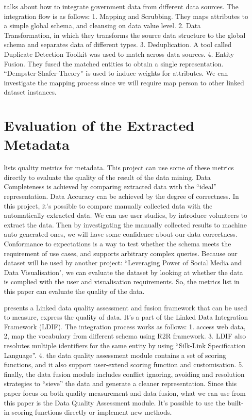 \cite{bohm2010} talks about how to integrate government data from different data sources. The integration flow is as follows: 1. Mapping and Scrubbing. They maps attributes to a simple global schema, and cleansing on data value level. 2. Data Transformation, in which they transforms the source data structure to the global schema and separates data of different types. 3. Deduplication. A tool called Duplicate Detection Toolkit was used to match across data sources. 4. Entity Fusion. They fused the matched entities to obtain a single representation. ``Dempster-Shafer-Theory'' is used to induce weights for attributes. We can investigate the mapping process since we will require map person to other linked dataset instances.

\section{Evaluation of the Extracted Metadata}


\cite{ochoa2006} lists quality metrics for metadata. This project can use some of these metrics directly to evaluate the quality of the result of the data mining. Data Completeness is achieved by comparing extracted data with the ``ideal'' representation. Data Accuracy can be achieved by the degree of correctness. In this project, it's possible to compare manually collected data with the automatically extracted data. We can use user studies, by introduce volunteers to extract the data. Then by investigating the manually collected results to machine auto-generated ones, we will have some confidence about our data correctness. Conformance to expectations is a way to test whether the schema meets the requirement of use cases, and supports arbitrary complex queries. Because our dataset will be used by another project: ``Leveraging Power of Social Media and Data Visualisation", we can evaluate the dataset by looking at whether the data is complied with the user and visualisation requirements. So, the metrics list in this paper can evaluate the quality of the data.

\cite{mendes2012} presents a Linked data quality assessment and fusion framework that can be used to measure, express the quality of data. It's a part of the Linked Data Integration Framework (LDIF). The integration process works as follows: 1. access web data, 2, map the vocabulary from different schema using R2R framework. 3. LDIF also resolutes multiple identifiers for the same entity by using ``Silk-Link Specification Language''. 4. the data quality assessment module contains a set of scoring functions, and it also support user-extend scoring function and customisation. 5. finally, the data fusion module includes conflict ignoring, avoiding and resolution strategies to ``sieve'' the data and generate a cleaner representation. Since this paper focus on both quality measurement and data fusion, what we can use from this paper is the Data Quality Assessment module. It's possible to use the built-in scoring functions directly or implement new methods.

